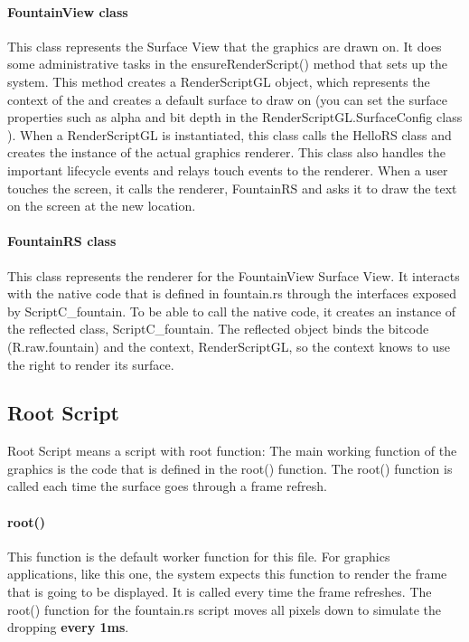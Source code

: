 \paragraph{FountainView class}
This class represents the Surface View that the \RS{} graphics are drawn on. It does some administrative tasks in the ensureRenderScript() method that sets up the \RS{} system. This method creates a RenderScriptGL object, which represents the context of the \RS{} and creates a default surface to draw on (you can set the surface properties such as alpha and bit depth in the RenderScriptGL.SurfaceConfig class ). When a RenderScriptGL is instantiated, this class calls the HelloRS class and creates the instance of the actual \RS{} graphics renderer.
This class also handles the important lifecycle events and relays touch events to the \RS{} renderer. When a user touches the screen, it calls the renderer, FountainRS and asks it to draw the text on the screen at the new location.

\paragraph{FountainRS class}
This class represents the \RS{} renderer for the FountainView Surface View. It interacts with the native \RS{} code that is defined in fountain.rs through the interfaces exposed by ScriptC\_fountain. To be able to call the native code, it creates an instance of the \RS{} reflected class, ScriptC\_fountain. The reflected \RS{} object binds the \RS{} bitcode (R.raw.fountain) and the \RS{} context, RenderScriptGL, so the context knows to use the right \RS{} to render its surface.


\subsection{Root Script}
\label{ss:RootScript}
Root Script means a script with root function:
The main working function of the graphics \RS{} is the code that is defined in the root() function. The root() function is called each time the surface goes through a frame refresh.

\paragraph{root()} This function is the default worker function for this \RS{} file. For graphics \RS{} applications, like this one, the \RS{} system expects this function to render the frame that is going to be displayed. It is called every time the frame refreshes. The root() function for the fountain.rs script moves all pixels down to simulate the dropping \textbf{every 1ms}.

